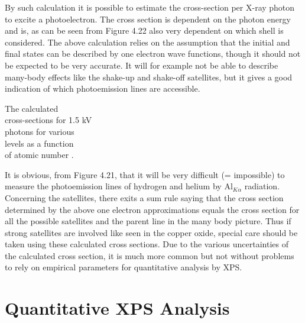           By  such  calculation  it  is  possible  to   estimate   the
          cross-section per X-ray photon  to  excite  a  photoelectron.
          The cross section is dependent  on  the  photon  energy  and
          is, as can be seen from Figure 4.22  also very dependent on which
          shell is considered. The above calculation relies on
          the assumption that the initial and final states can be
          described by one electron wave functions, though it should not be
          expected to be very accurate. It will for example not be able
          to describe many-body effects like the shake-up and shake-off
          satellites, but it gives a good indication of which
          photoemission lines are accessible.\\
             \vspace{1cm}

              The calculated\\ cross-sections
          for 1.5 kV\\ photons for various\\ levels as a function\\ of
          atomic number \cite{shofield}.\\

          \vspace{12cm}


              It is obvious, from Figure 4.21, that it
          will be very difficult (= impossible) to measure the
          photoemission lines of hydrogen and helium by Al$_{K\alpha}$
          radiation. Concerning the satellites, there exits a sum rule
          saying that the cross section determined by the above one
          electron approximations equals the cross section for all the
          possible satellites and the parent line in the many body
          picture. Thus if strong satellites are involved like seen in
          the copper oxide, special care should be taken using these
          calculated cross sections. Due to the various uncertainties of
          the calculated cross section, it is much more common but not
          without problems to rely on empirical parameters for
          quantitative analysis by XPS.








          \section{Quantitative XPS Analysis}


